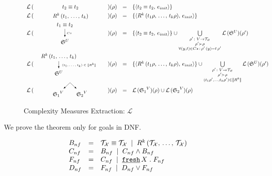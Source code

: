 \begin{figure}[t]
\[
\begin{array}{rclcl}
 \mathcal{L}\,(&\parbox[m]{1.3cm}{\schemenode{$\unigoal{t_2}{t_2}$}}&)(\rho) &=& \{\taskst{\unigoal{t_2}{t_2}}{e_{init}}\} \\

 \mathcal{L}\,(&\parbox[m]{2.5cm}{\schemenode{$\invokegoal{R^k}{t_1}{t_k}$}}&)(\rho) &=& \{\taskst{\invokegoal{R^k}{t_1 \rho}{t_k \rho}}{e_{init}}\} \\

 \mathcal{L}\,(&\parbox[m]{2cm}{\schemesarrow{$\unigoal{t_1}{t_2}$}{$Cs$}{$\schemewithvset{\mathfrak{S}}{U}$}} &)(\rho) &=&  \{\taskst{\unigoal{t_2}{t_2}}{e_{init}}\} \cup
      \bigcup\limits_{\substack{ \rho' \colon V \to \grterms \\
                                      \rho' \succ \rho \\
                                      \forall (y, t) \in Cs\,:\, \rho'\,(y) = t\, \rho'  }}
           \mathcal{L}\,(\schemewithvset{\mathfrak{S}}{U})(\rho')  \\

 \mathcal{L}\,(& \parbox[m]{4cm}{\schemedarrow{$\invokegoal{R^k}{t_1}{t_k}$}{ $(t_1, \dots, t_k) \in \sembr{R^k}  $}{$\schemewithvset{\mathfrak{S}}{U}$}} &)(\rho) &=&
      \{\taskst{\invokegoal{R^k}{t_1 \rho}{t_k \rho}}{e_{init}}\} \cup
      \bigcup\limits_{\substack{ \rho' \colon V \to \grterms \\
                                      \rho' \succ \rho \\
                                      (t_1 \rho', \dots, t_k \rho') \in \sembr{R^k}  }}
           \mathcal{L}\,(\schemewithvset{\mathfrak{S}}{U})(\rho')  \\

 \mathcal{L}\,(&\parbox[m]{2.5cm}{\schemefork{$\schemewithvset{\mathfrak{S}_1}{V}$}{$\schemewithvset{\mathfrak{S}_2}{V}$}}&)(\rho) &=&
 \mathcal{L}\,(\schemewithvset{\mathfrak{S}_1}{V})(\rho) \cup \mathcal{L}\,(\schemewithvset{\mathfrak{S}_2}{V})(\rho)
\end{array}
\]
\caption{Complexity Measures Extraction: $\mathcal L$}
\label{fig:scheduling_extraction_l}
\end{figure}

We prove the theorem only for goals in DNF.

\[
\begin{array}{lcl}
B_{nf} & = &  \mathcal{T}_\mathcal{X} \equiv \mathcal{T}_\mathcal{X} \; \mid \;
                     R^k\,(\mathcal{T}_\mathcal{X}, \, \dots, \, \mathcal{T}_\mathcal{X}) \\
C_{nf} & = & B_{nf} \; \mid \; C_{nf} \land B_{nf} \\
F_{nf} & = & C_{nf} \; \mid \; \texttt{\underline {fresh}} \, X\;.\; F_{nf} \\
D_{nf} & = & F_{nf} \; \mid \; D_{nf} \lor F_{nf}
\end{array}
\]

